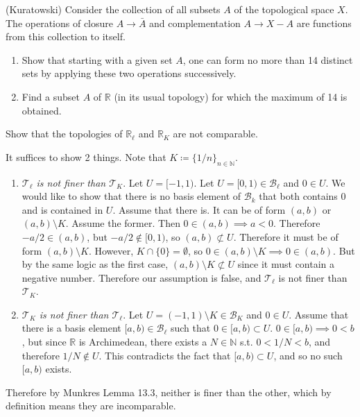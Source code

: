   \begin{exercise}[Munkres 17.21]
    (Kuratowski) Consider the collection of all subsets $A$ of the topological space $X$. The operations of closure $A \to \bar{A}$ and complementation $A \to X - A$ are functions from this collection to itself.
    \begin{enumerate}
      \item Show that starting with a given set $A$, one can form no more than 14 distinct sets by applying these two operations successively.
      \item Find a subset $A$ of $\mathbb{R}$ (in its usual topology) for which the maximum of 14 is obtained.
    \end{enumerate}
  \end{exercise}
  \begin{solution}
    
  \end{solution}


  \begin{exercise}[Munkres 13.6]
    Show that the topologies of $\mathbb{R}_\ell$ and $\mathbb{R}_K$ are not comparable.
  \end{exercise}
  \begin{solution}[Munkres 13.6]
    It suffices to show 2 things. Note that $K \coloneqq \{ 1/n \}_{n \in \mathbb{N}}$. 
    \begin{enumerate}
      \item \textit{$\mathcal{T}_\ell$ is not finer than $\mathcal{T}_K$}. Let $U = [-1, 1)$. Let $U = [0, 1) \in \mathscr{B}_\ell$ and $0 \in U$. We would like to show that there is no basis element of $\mathscr{B}_k$ that both contains $0$ and is contained in $U$. Assume that there is. It can be of form $(a, b)$ or $(a, b) \setminus K$. Assume the former. Then $0 \in (a, b) \implies a < 0$. Therefore $-a/2 \in (a, b)$, but $-a/2 \not\in [0, 1)$, so $(a, b) \not\subset U$. Therefore it must be of form $(a, b) \setminus K$. However, $K \cap \{0\} = \emptyset$, so $0 \in (a, b) \setminus K \implies 0 \in (a, b)$. But by the same logic as the first case, $(a, b) \setminus K \not\subset U$ since it must contain a negative number. Therefore our assumption is false, and $\mathcal{T}_{\ell}$ is not finer than $\mathcal{T}_K$. 
      \item \textit{$\mathcal{T}_K$ is not finer than $\mathcal{T}_\ell$}. Let $U = (-1, 1) \setminus K \in \mathscr{B}_K$ and $0 \in U$. Assume that there is a basis element $[a, b) \in \mathscr{B}_\ell$ such that $0 \in [a, b) \subset U$. $0 \in [a, b) \implies 0 < b$, but since $\mathbb{R}$ is Archimedean, there exists a $N \in \mathbb{N}$ s.t. $0 < 1/N < b$, and therefore $1/N \not\in U$. This contradicts the fact that $[a, b) \subset U$, and so no such $[a, b)$ exists. 
    \end{enumerate}
    Therefore by Munkres Lemma 13.3, neither is finer than the other, which by definition means they are incomparable. 
  \end{solution}


